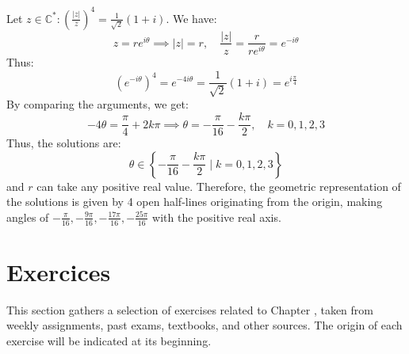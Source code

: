 \begin{eg}
    Let $z \in \mathbb{C}^*: (\frac{|z|}{z})^4 = \frac{1}{\sqrt{2}}(1 + i)$. We have:
    \[        z = r e^{i \theta} \implies |z| = r, \quad \frac{|z|}{z} = \frac{r}{r e^{i \theta}} = e^{-i \theta}
    \]
    Thus:
    \[        (e^{-i \theta})^4 = e^{-4i \theta} = \frac{1}{\sqrt{2}}(1 + i) = e^{i \frac{\pi}{4}}
    \]
    By comparing the arguments, we get:
    \[        -4 \theta = \frac{\pi}{4} + 2k\pi \implies \theta = -\frac{\pi}{16} - \frac{k\pi}{2}, \quad k = 0,1,2,3
    \]
    Thus, the solutions are:
    \[        \theta \in \left\{ -\frac{\pi}{16} - \frac{k\pi}{2} \mid k = 0,1,2,3 \right\}
    \]
    and $r$ can take any positive real value. Therefore, the geometric representation of the solutions is given by 4 open half-lines originating from the origin, making angles of $-\frac{\pi}{16}, -\frac{9\pi}{16}, -\frac{17\pi}{16}, -\frac{25\pi}{16}$ with the positive real axis.
\end{eg}

\section{Exercices} %
This section gathers a selection of exercises related to Chapter \thechapter, taken from weekly assignments, past exams, textbooks, and other sources. The origin of each exercise will be indicated at its beginning.